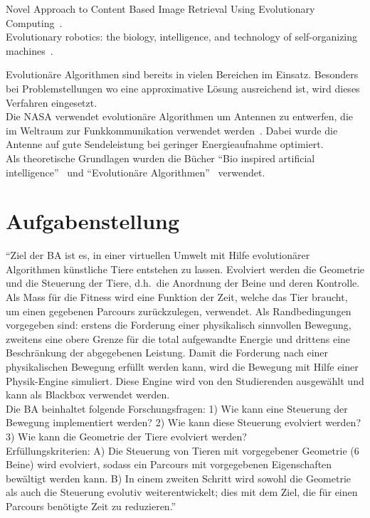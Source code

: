 

    Novel Approach to Content Based Image Retrieval Using Evolutionary Computing~\cite{Imran2014}.
    \\
    Evolutionary robotics: the biology, intelligence, and technology of self-organizing machines~\cite{Nolfi2001}.


    Evolutionäre Algorithmen sind bereits in vielen Bereichen im Einsatz.
    Besonders bei Problemstellungen wo eine approximative Lösung ausreichend ist,
    wird dieses Verfahren eingesetzt.
    \\
    Die NASA verwendet evolutionäre Algorithmen um Antennen zu entwerfen,
    die im Weltraum zur Funkkommunikation verwendet werden~\cite{Hornby2006}.
    Dabei wurde die Antenne auf gute Sendeleistung bei geringer Energieaufnahme optimiert.
    \\
    Als theoretische Grundlagen wurden die Bücher ``Bio inspired artificial intelligence''~\cite{book:bioInspired} und
    ``Evolutionäre Algorithmen''~\cite{book:evAlgo} verwendet.

  \section{Aufgabenstellung}

    ``Ziel der BA ist es,
    in einer virtuellen Umwelt mit Hilfe evolutionärer Algorithmen künstliche Tiere entstehen zu lassen.
    Evolviert werden die Geometrie und die Steuerung der Tiere,
    d.h.\ die Anordnung der Beine und deren Kontrolle.
    Als Mass für die Fitness wird eine Funktion der Zeit, welche das Tier braucht,
    um einen gegebenen Parcours zurückzulegen, verwendet.
    Als Randbedingungen vorgegeben sind: erstens die Forderung einer physikalisch sinnvollen Bewegung,
    zweitens eine obere Grenze für die total aufgewandte Energie und drittens eine Beschränkung der abgegebenen Leistung.
    Damit die Forderung nach einer physikalischen Bewegung erfüllt werden kann,
    wird die Bewegung mit Hilfe einer Physik-Engine simuliert.
    Diese Engine wird von den Studierenden ausgewählt und kann als Blackbox verwendet werden.
    \\
    Die BA beinhaltet folgende Forschungsfragen: 1) Wie kann eine Steuerung der Bewegung implementiert werden?
    2) Wie kann diese Steuerung evolviert werden? 3) Wie kann die Geometrie der Tiere evolviert werden?
    \\
    Erfüllungskriterien: A) Die Steuerung von Tieren mit vorgegebener Geometrie (6 Beine) wird evolviert,
    sodass ein Parcours mit vorgegebenen Eigenschaften bewältigt werden kann.
    B) In einem zweiten Schritt wird sowohl die Geometrie als auch die Steuerung evolutiv weiterentwickelt;
    dies mit dem Ziel, die für einen Parcours benötigte Zeit zu reduzieren.''~\cite{Task}

